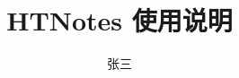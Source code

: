 
\usepackage{zhlipsum}
\usepackage{HTNotes-code}


\title{HTNotes 使用说明}
\author{张三}
\HTset{
}

\renewcommand\theequation{\arabic{section}-\arabic{equation}}